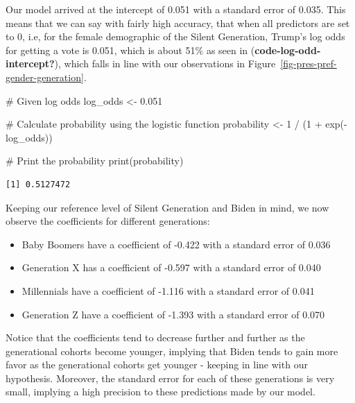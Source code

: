 \documentclass[
  letterpaper,
  DIV=11,
  numbers=noendperiod]{scrartcl}
\newenvironment{Shaded}{\begin{snugshade}}{\end{snugshade}}
\newcommand{\CommentTok}[1]{\textcolor[rgb]{0.37,0.37,0.37}{#1}}
\newcommand{\DecValTok}[1]{\textcolor[rgb]{0.68,0.00,0.00}{#1}}
\newcommand{\FloatTok}[1]{\textcolor[rgb]{0.68,0.00,0.00}{#1}}
\newcommand{\FunctionTok}[1]{\textcolor[rgb]{0.28,0.35,0.67}{#1}}
\newcommand{\NormalTok}[1]{\textcolor[rgb]{0.00,0.23,0.31}{#1}}
\newcommand{\OtherTok}[1]{\textcolor[rgb]{0.00,0.23,0.31}{#1}}
\newcommand{\SpecialCharTok}[1]{\textcolor[rgb]{0.37,0.37,0.37}{#1}}
\begin{document}
Our model arrived at the intercept of 0.051 with a standard error of
0.035. This means that we can say with fairly high accuracy, that when
all predictors are set to 0, i.e, for the female demographic of the
Silent Generation, Trump's log odds for getting a vote is 0.051, which
is about 51\% as seen in (\textbf{code-log-odd-intercept?}), which falls
in line with our observations in
Figure~\ref{fig-pres-pref-gender-generation}.

\begin{Shaded}
\begin{Highlighting}[]
\CommentTok{\# Given log odds}
\NormalTok{log\_odds }\OtherTok{\textless{}{-}} \FloatTok{0.051}

\CommentTok{\# Calculate probability using the logistic function}
\NormalTok{probability }\OtherTok{\textless{}{-}} \DecValTok{1} \SpecialCharTok{/}\NormalTok{ (}\DecValTok{1} \SpecialCharTok{+} \FunctionTok{exp}\NormalTok{(}\SpecialCharTok{{-}}\NormalTok{log\_odds))}

\CommentTok{\# Print the probability}
\FunctionTok{print}\NormalTok{(probability)}
\end{Highlighting}
\end{Shaded}

\begin{verbatim}
[1] 0.5127472
\end{verbatim}

Keeping our reference level of Silent Generation and Biden in mind, we
now observe the coefficients for different generations:

\begin{itemize}
\item
  Baby Boomers have a coefficient of -0.422 with a standard error of
  0.036
\item
  Generation X has a coefficient of -0.597 with a standard error of
  0.040
\item
  Millennials have a coefficient of -1.116 with a standard error of
  0.041
\item
  Generation Z have a coefficient of -1.393 with a standard error of
  0.070
\end{itemize}

Notice that the coefficients tend to decrease further and further as the
generational cohorts become younger, implying that Biden tends to gain
more favor as the generational cohorts get younger - keeping in line
with our hypothesis. Moreover, the standard error for each of these
generations is very small, implying a high precision to these
predictions made by our model.
\end{document}
